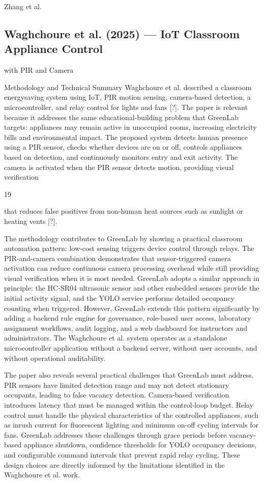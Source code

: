 Zhang et al.




\subsection{Waghchoure et al. (2025) --- IoT Classroom Appliance Control}

with PIR and Camera

Methodology and Technical Summary Waghchoure et al. described a classroom energysaving system using IoT, PIR motion sensing, camera-based detection, a microcontroller,
and relay control for lights and fans [?]. The paper is relevant because it addresses the
same educational-building problem that GreenLab targets: appliances may remain active
in unoccupied rooms, increasing electricity bills and environmental impact. The proposed
system detects human presence using a PIR sensor, checks whether devices are on or off,
controls appliances based on detection, and continuously monitors entry and exit activity.
The camera is activated when the PIR sensor detects motion, providing visual veriﬁcation

19


that reduces false positives from non-human heat sources such as sunlight or heating vents
[?].

The methodology contributes to GreenLab by showing a practical classroom automation pattern: low-cost sensing triggers device control through relays. The PIR-and-camera
combination demonstrates that sensor-triggered camera activation can reduce continuous
camera processing overhead while still providing visual veriﬁcation when it is most needed.
GreenLab adopts a similar approach in principle: the HC-SR04 ultrasonic sensor and other
embedded sensors provide the initial activity signal, and the YOLO service performs detailed occupancy counting when triggered. However, GreenLab extends this pattern significantly by adding a backend rule engine for governance, role-based user access, laboratory
assignment workﬂows, audit logging, and a web dashboard for instructors and administrators. The Waghchoure et al. system operates as a standalone microcontroller application
without a backend server, without user accounts, and without operational auditability.

The paper also reveals several practical challenges that GreenLab must address. PIR
sensors have limited detection range and may not detect stationary occupants, leading to
false vacancy detection. Camera-based veriﬁcation introduces latency that must be managed within the control-loop budget. Relay control must handle the physical characteristics
of the controlled appliances, such as inrush current for ﬂuorescent lighting and minimum
on-off cycling intervals for fans. GreenLab addresses these challenges through grace periods before vacancy-based appliance shutdown, conﬁdence thresholds for YOLO occupancy
decisions, and conﬁgurable command intervals that prevent rapid relay cycling. These design choices are directly informed by the limitations identiﬁed in the Waghchoure et al.
work.




